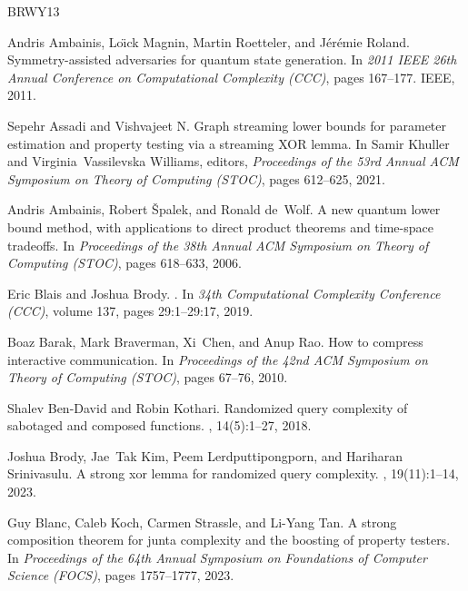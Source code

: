\documentclass[11pt]{article}
\begin{document}
\begin{thebibliography}{BRWY13}

Andris Ambainis, Lo{\"\i}ck Magnin, Martin Roetteler, and J{\'e}r{\'e}mie
  Roland.
\newblock Symmetry-assisted adversaries for quantum state generation.
\newblock In {\em 2011 IEEE 26th Annual Conference on Computational Complexity
  (CCC)}, pages 167--177. IEEE, 2011.

Sepehr Assadi and Vishvajeet N.
\newblock Graph streaming lower bounds for parameter estimation and property
  testing via a streaming {XOR} lemma.
\newblock In Samir Khuller and Virginia~Vassilevska Williams, editors, {\em
  Proceedings of the 53rd Annual {ACM} Symposium on Theory of Computing
  (STOC)}, pages 612--625, 2021.

Andris Ambainis, Robert {\v{S}}palek, and Ronald de~Wolf.
\newblock A new quantum lower bound method, with applications to direct product
  theorems and time-space tradeoffs.
\newblock In {\em Proceedings of the 38th Annual ACM Symposium on Theory of
  Computing (STOC)}, pages 618--633, 2006.

Eric Blais and Joshua Brody.
.
\newblock In {\em 34th Computational Complexity Conference (CCC)}, volume 137,
  pages 29:1--29:17, 2019.

Boaz Barak, Mark Braverman, Xi~Chen, and Anup Rao.
\newblock How to compress interactive communication.
\newblock In {\em Proceedings of the 42nd ACM Symposium on Theory of Computing
  (STOC)}, pages 67--76, 2010.

Shalev Ben-David and Robin Kothari.
\newblock Randomized query complexity of sabotaged and composed functions.
, 14(5):1--27, 2018.

Joshua Brody, Jae~Tak Kim, Peem Lerdputtipongporn, and Hariharan Srinivasulu.
\newblock A strong xor lemma for randomized query complexity.
, 19(11):1--14, 2023.

Guy Blanc, Caleb Koch, Carmen Strassle, and Li{-}Yang Tan.
\newblock A strong composition theorem for junta complexity and the boosting of
  property testers.
\newblock In {\em Proceedings of the 64th Annual Symposium on Foundations of
  Computer Science (FOCS)}, pages 1757--1777, 2023.


\end{thebibliography}
\end{document}
